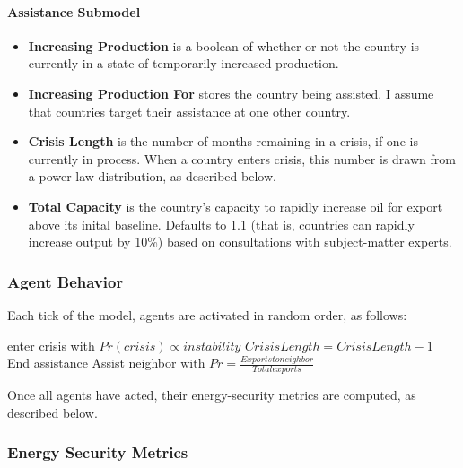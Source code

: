 \documentclass{article}
\begin{document}
\paragraph{Assistance Submodel}
\begin{itemize}
	\item \textbf{Increasing Production} is a boolean of whether or not the country is currently in a state of temporarily-increased production.
	\item \textbf{Increasing Production For} stores the country being assisted. I assume that countries target their assistance at one other country.
		\item \textbf{Crisis Length} is the number of months remaining in a crisis, if one is currently in process. When a country enters crisis, this number is drawn from a power law distribution, as described below.
			\item \textbf{Total Capacity} is the country's capacity to rapidly increase oil for export above its inital baseline. Defaults to 1.1 (that is, countries can rapidly increase output by 10\%) based on consultations with subject-matter experts. 
\end{itemize}

\subsubsection{Agent Behavior}

Each tick of the model, agents are activated in random order, as follows:

\begin{algorithm}[H]
	 {
		enter crisis with $Pr(crisis) \propto instability$ \;
		}{
		$Crisis Length = Crisis Length - 1$
		}
	 {
		 {
			 {
				End assistance\;
			}
		} {
			 {
				 {
					Assist neighbor with $Pr = \frac{Exports to neighbor}{Total exports}$
				}
			}
		}
	}	
\end{algorithm}

Once all agents have acted, their energy-security metrics are computed, as described below.

\subsubsection{Energy Security Metrics}
\end{document}
